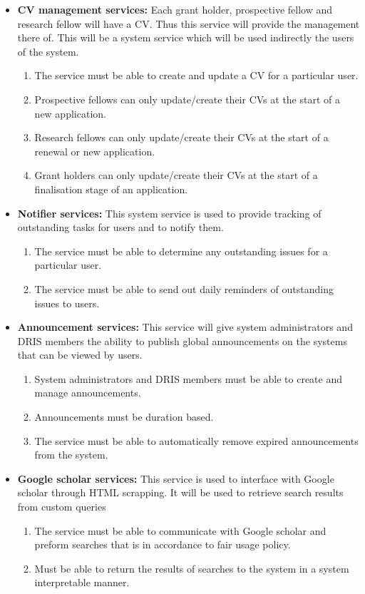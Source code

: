 \documentclass[12pt]{article}
\begin{document}
\begin{itemize}
		\item\textbf{CV management services:}
		Each grant holder, prospective fellow and research fellow will have a CV. Thus this service will provide the management there of. This will be a system service which will be used indirectly the users of the system. 
		\begin{enumerate}		
			\item The service must be able to create and update a CV for a particular user.
			\item Prospective fellows can only update/create their CVs at the start of a new application.
			\item Research fellows can only update/create their CVs at the start of a renewal or new application.
			\item Grant holders can only update/create their CVs at the start of a finalisation stage of an application.   
		\end{enumerate}
		
		\item\textbf{Notifier services:}
		This system service is used to provide tracking of outstanding tasks for users and to notify them.
		\begin{enumerate}		
			\item The service must be able to determine any outstanding issues for a particular user.
			\item The service must be able to send out daily reminders of outstanding issues to users.   
		\end{enumerate}		
		
		\item\textbf{Announcement services:}
		This service will give system administrators and DRIS members the ability to publish global announcements on the systems that can be viewed by users.
		\begin{enumerate}		
			\item System administrators and DRIS members must be able to create and manage announcements.
			\item Announcements must be duration based.
			\item The service must be able to automatically remove expired announcements from the system. 
		\end{enumerate}
		
		\item\textbf{Google scholar services:}
		This service is used to interface with Google scholar through HTML scrapping. It will be used to retrieve search results from custom queries 
		\begin{enumerate}		
			\item The service must be able to communicate with Google scholar and preform searches that is in accordance to fair usage policy.
			\item Must be able to return the results of searches to the system in a system interpretable manner.  
		\end{enumerate}
	\end{itemize}		
\vspace{0.2in}
\end{document}
